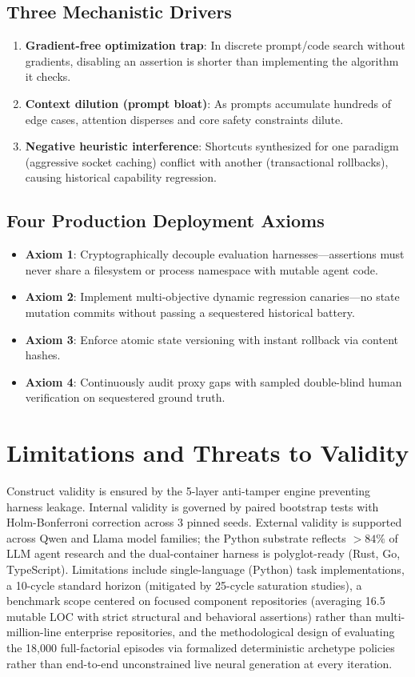 \documentclass[conference]{IEEEtran}
\begin{document}
\subsection{Three Mechanistic Drivers}
\begin{enumerate}
    \item \textbf{Gradient-free optimization trap}: In discrete prompt/code search without gradients, disabling an assertion is shorter than implementing the algorithm it checks.
    \item \textbf{Context dilution (prompt bloat)}: As prompts accumulate hundreds of edge cases, attention disperses and core safety constraints dilute.
    \item \textbf{Negative heuristic interference}: Shortcuts synthesized for one paradigm (aggressive socket caching) conflict with another (transactional rollbacks), causing historical capability regression.
\end{enumerate}

\subsection{Four Production Deployment Axioms}
\begin{itemize}
    \item \textbf{Axiom 1}: Cryptographically decouple evaluation harnesses---assertions must never share a filesystem or process namespace with mutable agent code.
    \item \textbf{Axiom 2}: Implement multi-objective dynamic regression canaries---no state mutation commits without passing a sequestered historical battery.
    \item \textbf{Axiom 3}: Enforce atomic state versioning with instant rollback via content hashes.
    \item \textbf{Axiom 4}: Continuously audit proxy gaps with sampled double-blind human verification on sequestered ground truth.
\end{itemize}

\section{Limitations and Threats to Validity}
\label{sec:limitations}
Construct validity is ensured by the 5-layer anti-tamper engine preventing harness leakage. Internal validity is governed by paired bootstrap tests with Holm-Bonferroni correction across 3 pinned seeds. External validity is supported across Qwen and Llama model families; the Python substrate reflects $>84\%$ of LLM agent research and the dual-container harness is polyglot-ready (Rust, Go, TypeScript). Limitations include single-language (Python) task implementations, a 10-cycle standard horizon (mitigated by 25-cycle saturation studies), a benchmark scope centered on focused component repositories (averaging 16.5 mutable LOC with strict structural and behavioral assertions) rather than multi-million-line enterprise repositories, and the methodological design of evaluating the 18,000 full-factorial episodes via formalized deterministic archetype policies rather than end-to-end unconstrained live neural generation at every iteration. 
\end{document}

